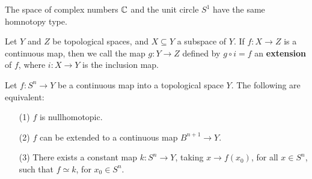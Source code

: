 \begin{example}\label{2.1}
    The space of complex numbers $\mathbb{C}$ and the unit circle  $S^1$ have the same
    homnotopy type.
\end{example}

\begin{definition}
    Let $Y$ and  $Z$ be topological spaces, and  $X \subseteq Y$ a subspace of
    $Y$. If  $f:X \xrightarrow{} Z$ is a continuous map, then we call the map
    $g:Y \xrightarrow{} Z$ defined by $g \circ i=f$ an \textbf{extension} of
    $f$, where  $i:X \xrightarrow{} Y$ is the inclusion map.
\end{definition}

\begin{theorem}\label{2.1.5}
    Let $f:S^n \xrightarrow{} Y$ be a continuous map into a topological space
    $Y$. The following are equivalent:
    \begin{enumerate}
        \item[(1)] $f$ is nullhomotopic.

        \item[(2)] $f$ can be extended to a continuous map  $B^{n+1}
            \xrightarrow{} Y$.

        \item[(3)] There exists a constant map $k:S^n \xrightarrow{} Y$, taking
            $x \xrightarrow{} f(x_0)$, for all $x \in S^n$, such that $f \simeq
            k$, for $x_0 \in S^n$.
    \end{enumerate}
\end{theorem}
